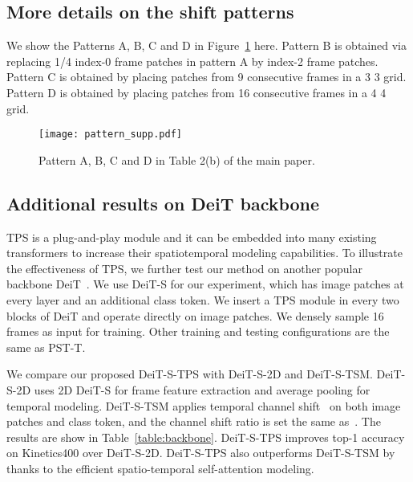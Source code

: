 \documentclass[runningheads]{llncs}
\begin{document}
	\subsection{More details on the shift patterns}
	We show the Patterns A, B, C and D in Figure~\ref{fig:shift_pattern} here. Pattern B is obtained via replacing 1/4 index-0 frame patches in pattern A by index-2 frame patches. Pattern C is obtained by placing patches from 9 consecutive frames in a 3  3 grid. Pattern D is obtained by placing patches from 16 consecutive frames in a 4  4 grid.
	
	
	\begin{figure}[h]
		\vspace{-1mm}
		\begin{center}
			\texttt{[image: pattern\_supp.pdf]}
\caption{Pattern A, B, C and D in Table 2(b) of the main paper.}
\label{fig:shift_pattern}
		\end{center}
		
	\end{figure}
	
	
	
	\subsection{Additional results on DeiT backbone}
	


	TPS is a plug-and-play module and it can be embedded into many existing transformers to increase their spatiotemporal modeling capabilities. To illustrate the effectiveness of TPS, we further test our method on another popular backbone DeiT~\cite{touvron2021training}. We use DeiT-S for our experiment, which has  image patches at every layer and an additional class token.  We insert a TPS module in every two blocks of DeiT and operate directly on image patches. We densely sample 16 frames as input for training. Other training and testing configurations are the same as PST-T. 
	
	We compare our proposed DeiT-S-TPS with DeiT-S-2D and DeiT-S-TSM. DeiT-S-2D uses 2D DeiT-S for frame feature extraction and average pooling for temporal modeling. DeiT-S-TSM applies temporal channel shift~\cite{lin2019tsm} on both image patches and class token, and the channel shift ratio is set the same as~\cite{lin2019tsm}. The results are show in Table~\ref{table:backbone}. DeiT-S-TPS improves  top-1 accuracy on Kinetics400 over DeiT-S-2D. DeiT-S-TPS also outperforms DeiT-S-TSM by  thanks to the efficient spatio-temporal self-attention modeling.
	
\end{document}
